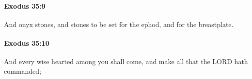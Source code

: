 		\paragraph{Exodus 35:9} %
			\label{EXODUS-35-9}

			And onyx stones, and stones to be set for the ephod, and for the breastplate.


		\paragraph{Exodus 35:10} %
			\label{EXODUS-35-10}

			And every wise hearted among you shall come, and make all that the LORD hath commanded;


